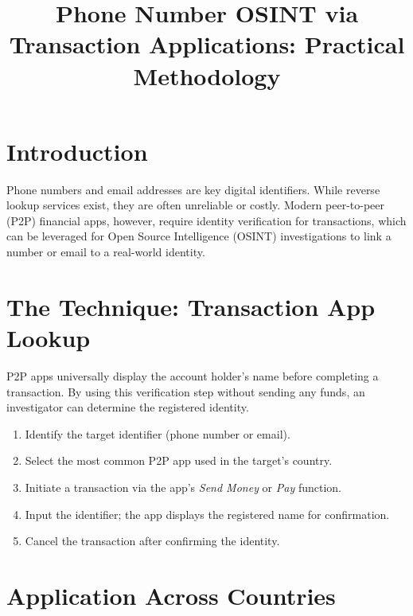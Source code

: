 \documentclass[12pt]{article}
\title{Phone Number OSINT via Transaction Applications: Practical Methodology}
\author{}
\date{}
\begin{document}
\maketitle

\section{Introduction}

Phone numbers and email addresses are key digital identifiers. While reverse lookup services exist, they are often unreliable or costly. Modern peer-to-peer (P2P) financial apps, however, require identity verification for transactions, which can be leveraged for Open Source Intelligence (OSINT) investigations to link a number or email to a real-world identity.

\section{The Technique: Transaction App Lookup}

P2P apps universally display the account holder's name before completing a transaction. By using this verification step without sending any funds, an investigator can determine the registered identity.

\begin{enumerate}
    \item Identify the target identifier (phone number or email).
    \item Select the most common P2P app used in the target's country.
    \item Initiate a transaction via the app’s \textit{Send Money} or \textit{Pay} function.
    \item Input the identifier; the app displays the registered name for confirmation.
    \item Cancel the transaction after confirming the identity.
\end{enumerate}

\section{Application Across Countries}
\end{document}
